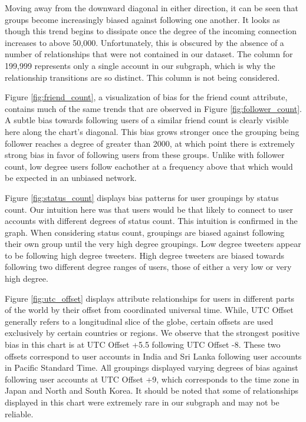 Moving away from the downward diagonal in either direction, it can be seen that groups become increasingly biased against following one another.  It looks as though this trend begins to dissipate once the degree of the incoming connection increases to above 50,000.  Unfortunately, this is obscured by the absence of a number of relationships that were not contained in our dataset.  The column for 199,999 represents only a single account in our subgraph, which is why the relationship transitions are so distinct.  This column is not being considered.

Figure \ref{fig:friend_count}, a visualization of bias for the friend count attribute, contains much of the same trends that are observed in Figure \ref{fig:follower_count}.  A subtle bias towards following users of a similar friend count is clearly visible here along the chart's diagonal.  This bias grows stronger once the grouping being follower reaches a degree of greater than 2000, at which point there is extremely strong bias in favor of following users from these groups.  Unlike with follower count, low degree users follow eachother at a frequency above that which would be expected in an unbiased network.

Figure \ref{fig:status_count} displays bias patterns for user groupings by status count.  Our intuition here was that users would be that likely to connect to user accounts with different degrees of status count.  This intuition is confirmed in the graph.  When considering status count, groupings are biased against following their own group until the very high degree groupings.  Low degree tweeters appear to be following high degree tweeters.  High degree tweeters are biased towards following two different degree ranges of users, those of either a very low or very high degree.

Figure \ref{fig:utc_offset} displays attribute relationships for users in different parts of the world by their offset from coordinated universal time.  While, UTC Offset generally refers to a longitudinal slice of the globe, certain offsets are used exclusively by certain countries or regions.  We observe that the strongest positive bias in this chart is at UTC Offset +5.5 following UTC Offset -8.  These two offsets correspond to user accounts in India and Sri Lanka following user accounts in Pacific Standard Time.  All groupings displayed varying degrees of bias against following user accounts at UTC Offset +9, which corresponds to the time zone in Japan and North and South Korea.  It should be noted that some of relationships displayed in this chart were extremely rare in our subgraph and may not be reliable.
 
